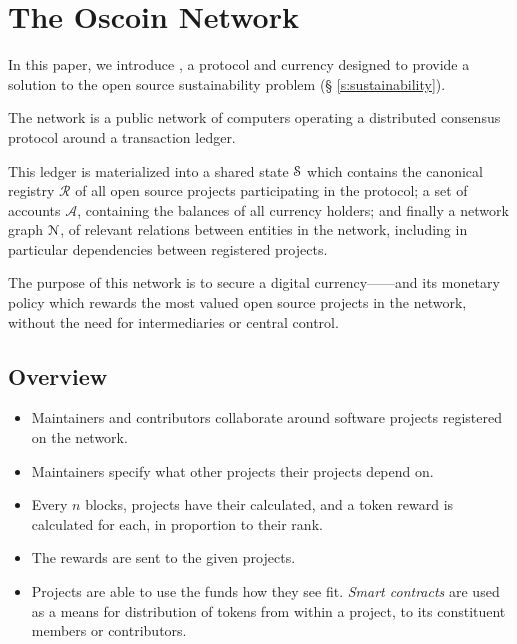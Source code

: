 \section{The Oscoin Network}
\label{s:oscoin}



\noindent In this paper, we introduce \oscoin{}, a protocol and currency
designed to provide a solution to the open source sustainability problem (\S
\ref{s:sustainability}).

The \oscoin{} network is a public network of computers operating a distributed
consensus protocol around a transaction ledger.


This ledger is materialized into a shared state $\mathcal{S}$ which
contains the canonical registry $\mathcal{R}$ of all open source
projects participating in the \oscoin{} protocol; a set of accounts
$\mathcal{A}$, containing the balances of all currency holders; and
finally a network graph $\mathcal{N}$, of relevant relations between
entities in the network, including in particular dependencies between
registered projects.

The purpose of this network is to secure a digital currency---\oscoin{}---and
its monetary policy which rewards the most valued open source projects in the
network, without the need for intermediaries or central control.

\subsection{Overview}

\begin{itemize}
    \item Maintainers and contributors collaborate around software projects
        registered on the network.
    \item Maintainers specify what other projects their projects depend on.
    \item Every $n$ blocks, projects have their \osrank{} calculated, and a
        token reward is calculated for each, in proportion to their rank.
    \item The rewards are sent to the given projects.
    \item Projects are able to use the funds how they see fit. \emph{Smart
        contracts} are used as a means for distribution of tokens from within a
        project, to its constituent members or contributors.
\end{itemize}

